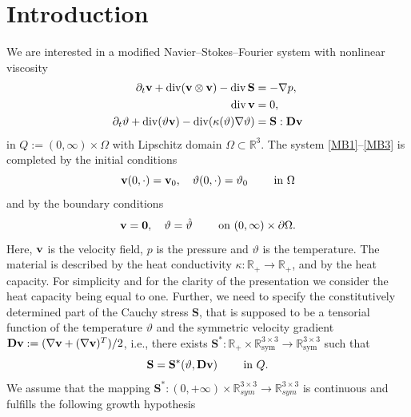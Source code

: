 \documentclass[11pt, a4paper, reqno]{amsart}
\newcommand{\R}{{\mathbb R}}
\numberwithin{equation}{section}
\newcommand{\diver}{\operatorname{div}}
\newcommand{\dert}{\partial_t}
\newcommand{\thetah}{\hat\thet}
\newcommand{\vc}[1]{{\bf #1}}
\newcommand{\vv}{\vc{v}}
\newcommand{\thet}{\vartheta}
\renewcommand{\S}{\mathbf{S}}
\newcommand{\D}{\mathbf{D}}
\begin{document}
\maketitle

\section{Introduction}
We are interested in a modified Navier--Stokes--Fourier system with nonlinear viscosity
\begin{align}
\dert \vv + \diver(\vv \otimes \vv) -\diver \S &= - \nabla p,\label{MB1}\\
\diver \vv &= 0,\label{MB2}\\
\dert \thet + \diver ( \thet \vv) - \diver (\kappa(\thet)\nabla \thet) &= \S : \D \vv \label{MB3}
\end{align}
in $Q:=(0,\infty)\times \Omega$ with Lipschitz domain $\Omega\subset\R^3$. The system \eqref{MB1}--\eqref{MB3} is completed by the initial conditions
\begin{equation}\label{MB4}
\vv(0, \cdot)=\vv_0, \quad \thet(0, \cdot)=\thet_0 \qquad \textrm{ in } \Omega
\end{equation}
and by the boundary conditions
\begin{equation}
\label{MB5}
\vv=\vc{0}, \quad \thet=\thetah   \qquad \textrm{ on } (0, \infty)\times \partial \Omega.
\end{equation}
Here, $\vv$ is the velocity field, $p$ is the pressure and $\thet$ is the temperature. The material is described by the heat conductivity $\kappa:\mathbb{R}_+ \to \mathbb{R}_+$, and by the heat capacity. For simplicity and for the clarity of the presentation we consider the heat capacity being equal to one. Further, we need to specify the constitutively determined part of the Cauchy stress $\S$, that is supposed to be a tensorial function of the temperature $\thet$ and the symmetric velocity gradient $\D\vv:=(\nabla \vv +(\nabla \vv)^T)/2$, i.e., there exists $\S^*:\mathbb{R}_+ \times \mathbb{R}^{3\times 3}_{\textrm{sym}} \to \mathbb{R}^{3\times 3}_{\textrm{sym}}$ such that 
\begin{equation}\label{def:S}
\S = \S^*(\thet, \D \vv) \qquad \textrm{ in }Q.
\end{equation}
We assume that the mapping $\S^*:(0,+\infty)\times\R^{3\times 3}_{sym}\to \R^{3\times 3}_{sym}$ is continuous and  fulfills the following growth hypothesis
\end{document}
